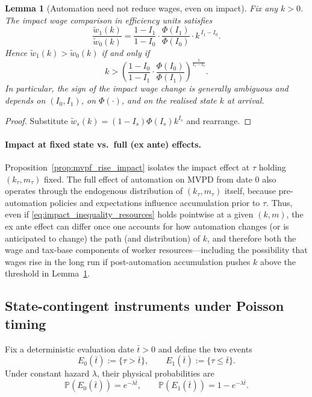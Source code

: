 \documentclass{article}
\newtheorem{lemma}{Lemma}
\begin{document}
\begin{lemma}[Automation need not reduce wages, even on impact]
\label{lem:wage_ambiguous_impact}
Fix any $k>0$. The impact wage comparison in efficiency units satisfies
\begin{equation}
\label{eq:wage_ratio}
\frac{\widetilde w_1(k)}{\widetilde w_0(k)}
=
\frac{1-I_1}{1-I_0}\cdot \frac{\Phi(I_1)}{\Phi(I_0)}\cdot k^{\,I_1-I_0}.
\end{equation}
Hence $\widetilde w_1(k)>\widetilde w_0(k)$ if and only if
\begin{equation}
\label{eq:wage_crossing_threshold}
k >
\left(
\frac{1-I_0}{1-I_1}\cdot \frac{\Phi(I_0)}{\Phi(I_1)}
\right)^{\!\frac{1}{I_1-I_0}}.
\end{equation}
In particular, the sign of the impact wage change is generally ambiguous and depends on $(I_0,I_1)$, on $\Phi(\cdot)$, and on the realised state $k$ at arrival.
\end{lemma}

\begin{proof}
Substitute $\widetilde w_s(k)=(1-I_s)\Phi(I_s)k^{I_s}$ and rearrange.
\end{proof}

\paragraph{Impact at fixed state vs.\ full (ex ante) effects.}
Proposition~\ref{prop:mvpf_rise_impact} isolates the impact effect at $\tau$ holding $(k_\tau,m_\tau)$ fixed. The full effect of automation on MVPD from date $0$ also operates through the endogenous distribution of $(k_\tau,m_\tau)$ itself, because pre-automation policies and expectations influence accumulation prior to $\tau$. Thus, even if \eqref{eq:impact_inequality_resources} holds pointwise at a given $(k,m)$, the ex ante effect can differ once one accounts for how automation changes (or is anticipated to change) the path (and distribution) of $k$, and therefore both the wage and tax-base components of worker resources---including the possibility that wages rise in the long run if post-automation accumulation pushes $k$ above the threshold in Lemma~\ref{lem:wage_ambiguous_impact}.

\subsection{State-contingent instruments under Poisson timing}
\label{sec:mvpf_spanning}

Fix a deterministic evaluation date $\bar t>0$ and define the two events
\begin{equation}
\label{eq:events}
E_0(\bar t) := \{\tau > \bar t\},\qquad
E_1(\bar t) := \{\tau \le \bar t\}.
\end{equation}
Under constant hazard $\lambda$, their physical probabilities are
\begin{equation}
\label{eq:event_probs}
\mathbb P(E_0(\bar t))=e^{-\lambda \bar t},\qquad
\mathbb P(E_1(\bar t))=1-e^{-\lambda \bar t}.
\end{equation}
\end{document}
